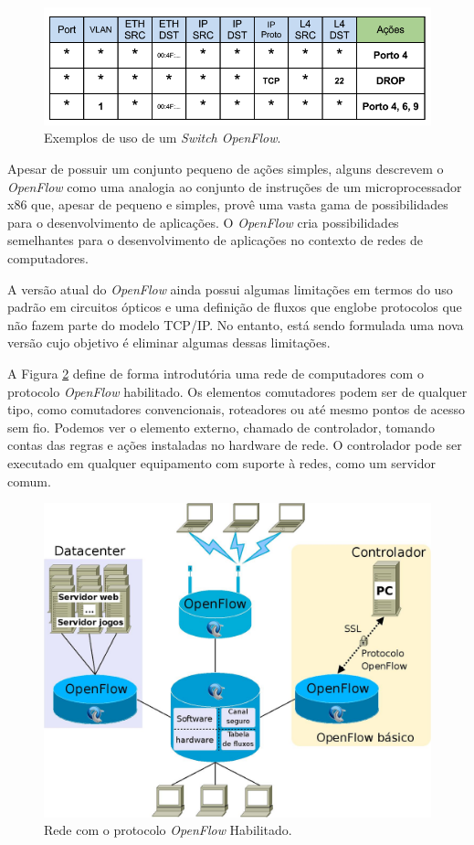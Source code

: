 \begin{figure}[hb] \centering
\includegraphics[width=160mm]{exemploSwitchOpenFlow.png} 
\caption{Exemplos de uso de um \textit{Switch OpenFlow}.} 
\label{fig:exemploSwitchOpenFlow} 
\end{figure}

Apesar de possuir um conjunto pequeno de ações simples, 
alguns descrevem o \textit{OpenFlow} como uma analogia ao conjunto 
de instruções de um microprocessador x86 que, apesar de 
pequeno e simples, provê uma vasta gama de possibilidades 
para o desenvolvimento de aplicações. O \textit{OpenFlow} cria 
possibilidades semelhantes para o desenvolvimento de 
aplicações no contexto de redes de computadores. 

A versão atual do \textit{OpenFlow} ainda possui algumas limitações
em termos do uso padrão em circuitos ópticos e uma definição 
de fluxos que englobe protocolos que não fazem parte do 
modelo TCP/IP. No entanto, está sendo formulada uma nova
versão cujo objetivo é eliminar algumas dessas limitações.

A Figura \ref{fig:openflow} define de forma introdutória uma 
rede de computadores com o protocolo \textit{OpenFlow} habilitado. Os 
elementos comutadores podem ser de qualquer tipo, como 
comutadores convencionais, roteadores ou até mesmo pontos
de acesso sem fio. Podemos ver o elemento externo, chamado
de controlador, tomando contas das regras e ações instaladas
no hardware de rede. O controlador pode ser executado em 
qualquer equipamento com suporte à redes, como um 
servidor comum.

\begin{figure}[hb] \centering
\includegraphics[width=160mm]{openflow.png} 
\caption{Rede com o protocolo \textit{OpenFlow} Habilitado.} 
\label{fig:openflow} 
\end{figure}

